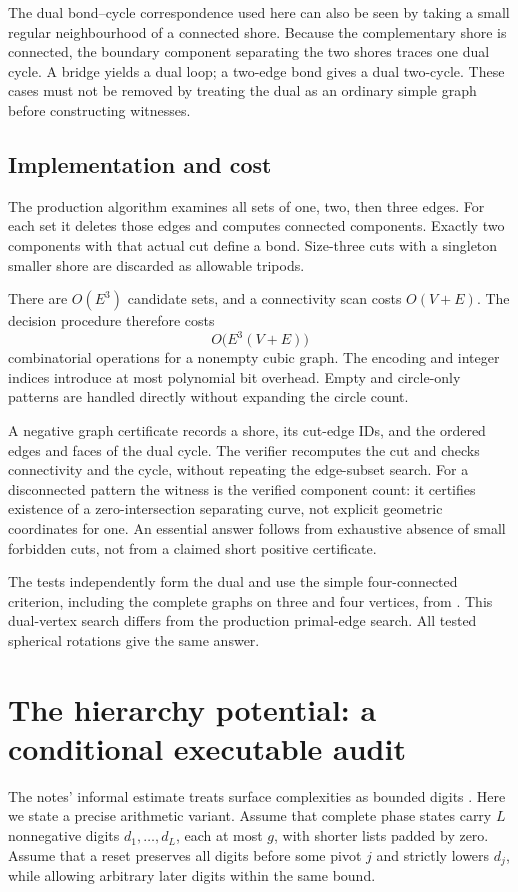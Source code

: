\documentclass[11pt]{article}
\theoremstyle{remark}\newtheorem{remark}[theorem]{Remark}
\begin{document}
The dual bond--cycle correspondence used here can also be seen by taking a
small regular neighbourhood of a connected shore. Because the complementary
shore is connected, the boundary component separating the two shores traces
one dual cycle. A bridge yields a dual loop; a two-edge bond gives a dual
two-cycle. These cases must not be removed by treating the dual as an ordinary
simple graph before constructing witnesses.

\subsection{Implementation and cost}
The production algorithm examines all sets of one, two, then three edges.
For each set it deletes those edges and computes connected components. Exactly
two components with that actual cut define a bond. Size-three cuts with a
singleton smaller shore are discarded as allowable tripods.

There are $O(E^3)$ candidate sets, and a connectivity scan costs $O(V+E)$.
The decision procedure therefore costs
\[
 O\bigl(E^3(V+E)\bigr)
\]
combinatorial operations for a nonempty cubic graph. The encoding and integer
indices introduce at most polynomial bit overhead. Empty and circle-only
patterns are handled directly without expanding the circle count.

A negative graph certificate records a shore, its cut-edge IDs, and the ordered
edges and faces of the dual cycle. The verifier recomputes the cut and checks
connectivity and the cycle, without repeating the edge-subset search. For a
disconnected pattern the witness is the verified component count: it certifies
existence of a zero-intersection separating curve, not explicit geometric
coordinates for one. An essential answer follows from exhaustive absence of
small forbidden cuts, not from a claimed short positive certificate.

The tests independently form the dual and use the simple four-connected
criterion, including the complete graphs on three and four vertices,
from \cite[Proposition~2.6]{lackenby2026}. This dual-vertex search differs from
the production primal-edge search. All tested spherical rotations give the
same answer.

\section{The hierarchy potential: a conditional executable audit}
\label{sec:bound}

The notes' informal estimate treats surface complexities as bounded digits
\cite[pp.~60--65]{notes}. Here we state a precise arithmetic variant. Assume
that complete phase states carry $L$ nonnegative digits $d_1,\ldots,d_L$, each
at most $g$, with shorter lists padded by zero. Assume that a reset preserves
all digits before some pivot $j$ and strictly lowers $d_j$, while allowing
arbitrary later digits within the same bound.
\end{document}
